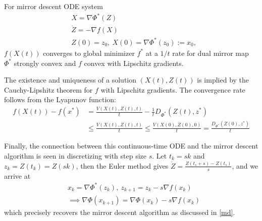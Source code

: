 \begin{theorem}
For mirror descent ODE system
\begin{align*}
&X = \nabla \Phi^*(Z)\\
&\dot Z = - \nabla f(X)\\
& Z(0) = z_0,~X(0) = \nabla \Phi^*(z_0) := x_0,
\end{align*}
$f(X(t))$ converges to global minimizer $f^*$ at a $1/t$ rate for dual mirror map $\Phi^*$ strongly convex and $f$ convex with Lipschitz gradients.
\end{theorem}
\proofstart
The existence and uniqueness of a solution $(X(t),Z(t))$ is implied by the Cauchy-Lipshitz theorem for $f$ with Lipschitz gradients. The convergence rate follows from the Lyapunov function:
\begin{align*}
    f(X(t)) - f(x^*) &= \frac{V(X(t),Z(t), t)}{t} - \frac{1}{t} D_{\Phi^*} (Z(t), z^*) \\&\leq \frac{V(X(t),Z(t), t)}{t} \leq \frac{V(X(0),Z(0), 0)}{t} =  \frac{D_{\Phi^*} (Z(0), z^*) }{t}
\end{align*}
\proofend

Finally, the connection between this continuous-time ODE and the mirror descent algorithm is seen in discretizing with step size $s$. Let $t_k = sk$ and $z_k = Z(t_k) = Z(sk)$, then the Euler method gives $\dot Z = \frac{Z(t_s + s) - Z(t_s)}{s}$, and we arrive at
\begin{align*}
&x_k = \nabla \Phi^*(z_k),~z_{k+1} = z_k - s \nabla f(x_k)\\
&\implies \nabla \Phi(x_{k+1}) = \nabla \Phi(x_k) - s \nabla f(x_k)
\end{align*}
which precisely recovers the mirror descent algorithm as discussed in \eqref{md}.

